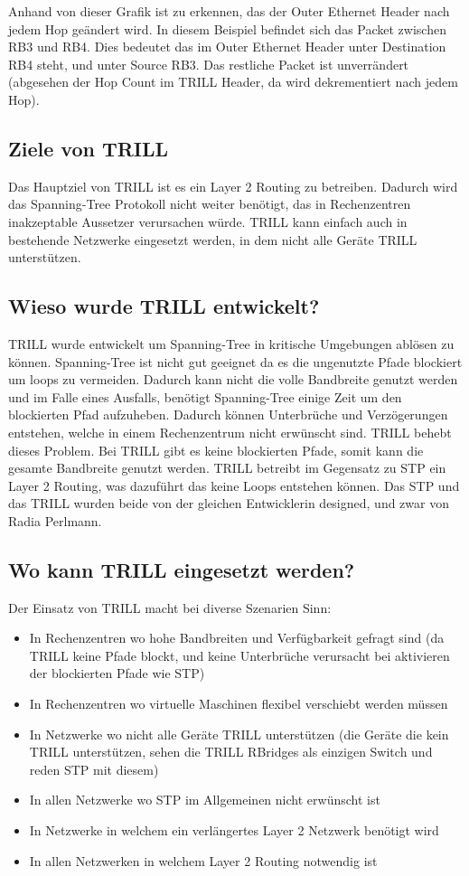 \documentclass[a4,12pt]{scrartcl}
\begin{document}
\noindent Anhand von dieser Grafik ist zu erkennen, das der Outer Ethernet Header nach jedem Hop geändert wird. In diesem Beispiel befindet sich das Packet zwischen RB3 und RB4. Dies bedeutet das im Outer Ethernet Header unter Destination RB4 steht, und unter Source RB3. Das restliche Packet ist unverrändert (abgesehen der Hop Count im TRILL Header, da wird dekrementiert nach jedem Hop). 
\newpage

\subsection{Ziele von TRILL}
Das Hauptziel von TRILL ist es ein Layer 2 Routing zu betreiben. Dadurch wird das Spanning-Tree Protokoll nicht weiter benötigt, das in Rechenzentren inakzeptable Aussetzer verursachen würde. TRILL kann einfach auch in bestehende Netzwerke eingesetzt werden, in dem nicht alle Geräte TRILL unterstützen. 

\subsection{Wieso wurde TRILL entwickelt?}
TRILL wurde entwickelt um Spanning-Tree in kritische Umgebungen ablösen zu können. Spanning-Tree ist nicht gut geeignet da es die ungenutzte Pfade blockiert um loops zu vermeiden. Dadurch kann nicht die volle Bandbreite genutzt werden und im Falle eines Ausfalls, benötigt Spanning-Tree einige Zeit um den blockierten Pfad aufzuheben. Dadurch können Unterbrüche und Verzögerungen entstehen, welche in einem Rechenzentrum nicht erwünscht sind. TRILL behebt dieses Problem. Bei TRILL gibt es keine blockierten Pfade, somit kann die gesamte Bandbreite genutzt werden. TRILL betreibt im Gegensatz zu STP ein Layer 2 Routing, was dazuführt das keine Loops entstehen können. Das STP und das TRILL wurden beide von der gleichen Entwicklerin designed, und zwar von Radia Perlmann. 

\subsection{Wo kann TRILL eingesetzt werden?}
Der Einsatz von TRILL macht bei diverse Szenarien Sinn: 
\begin{itemize}
\item In Rechenzentren wo hohe Bandbreiten und Verfügbarkeit gefragt sind (da TRILL keine Pfade blockt, und keine Unterbrüche verursacht bei aktivieren der blockierten Pfade wie STP) 
\item In Rechenzentren wo virtuelle Maschinen flexibel verschiebt werden müssen
\item In Netzwerke wo nicht alle Geräte TRILL unterstützen (die Geräte die kein TRILL unterstützen, sehen die TRILL RBridges als einzigen Switch und reden STP mit diesem)
\item In allen Netzwerke wo STP im Allgemeinen nicht erwünscht ist 
\item In Netzwerke in welchem ein verlängertes Layer 2 Netzwerk benötigt wird 
\item In allen Netzwerken in welchem Layer 2 Routing notwendig ist 
\end{itemize}
\end{document}

